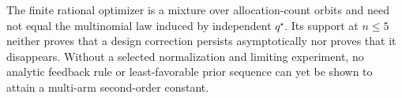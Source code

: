 The finite rational optimizer is a mixture over allocation-count orbits and need not equal the multinomial law induced by independent \(q^\star\).  Its support at \(n\leq5\) neither proves that a design correction persists asymptotically nor proves that it disappears.  Without a selected normalization and limiting experiment, no analytic feedback rule or least-favorable prior sequence can yet be shown to attain a multi-arm second-order constant.